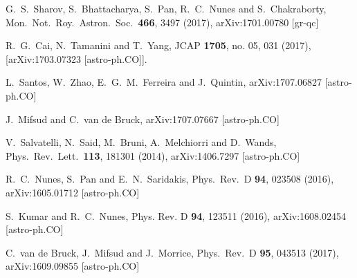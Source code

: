 \documentclass[superscriptaddress,oneolumn,secnumarabic,
amssymb,amsmath,nobibnotes,aps,prd,showpacs,nofootinbib]{revtex4}%
\begin{document}
\begin{thebibliography}{*}
  G.~S.~Sharov, S.~Bhattacharya, S.~Pan, R.~C.~Nunes and S.~Chakraborty,
  Mon.\ Not.\ Roy.\ Astron.\ Soc.\  {\bf 466}, 3497 (2017),
  arXiv:1701.00780 [gr-qc]


  R.~G.~Cai, N.~Tamanini and T.~Yang,
  JCAP {\bf 1705}, no. 05, 031 (2017),
  [arXiv:1703.07323 [astro-ph.CO]].


  L.~Santos, W.~Zhao, E.~G.~M.~Ferreira and J.~Quintin,
  arXiv:1707.06827 [astro-ph.CO]


  J.~Mifsud and C.~van de Bruck,
  arXiv:1707.07667 [astro-ph.CO]





V.~Salvatelli, N.~Said, M.~Bruni, A.~Melchiorri and D.~Wands,
Phys.\ Rev.\ Lett.\  {\bf 113}, 181301 (2014),
arXiv:1406.7297 [astro-ph.CO]


R.~C.~Nunes, S.~Pan and E.~N.~Saridakis,
Phys.\ Rev.\ D {\bf 94},  023508 (2016),
arXiv:1605.01712 [astro-ph.CO]



S.~Kumar and R.~C.~Nunes, Phys. Rev. D \textbf{94}, 123511 (2016),
arXiv:1608.02454 [astro-ph.CO]






C.~van de Bruck, J.~Mifsud and J.~Morrice,
Phys.\ Rev.\ D {\bf 95}, 043513 (2017),
arXiv:1609.09855 [astro-ph.CO]



\end{thebibliography}
\end{document}
